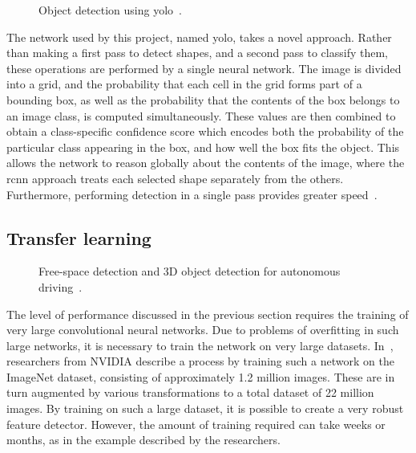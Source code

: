\documentclass[\rootfolder/main.tex]{subfiles}
\begin{document}
\begin{figure}[H]
    \caption[Object detection using \acrshort{yolo}.]{Object detection using \acrshort{yolo}~\cite{JosephRedmon}.}
    \label{fig:yolo}
\end{figure}

The network used by this project, named \acrfull{yolo}, takes a novel approach.
Rather than making a first pass to detect shapes, and a second pass to classify them, these operations are performed by a single neural network.
The image is divided into a grid, and the probability that each cell in the grid forms part of a bounding box, as well as the probability that the contents of the box belongs to an image class, is computed simultaneously.
These values are then combined to obtain a class-specific confidence score which encodes both the probability of the particular class appearing in the box, and how well the box fits the object.
This allows the network to reason globally about the contents of the image, where the \acrshort{rcnn} approach treats each selected shape separately from the others.
Furthermore, performing detection in a single pass provides greater speed~\cite{Redmon2015}.


\subsection{Transfer learning}

\begin{figure}
    \caption[Free-space detection and 3D object detection for autonomous driving.]{Free-space detection and 3D object detection for autonomous driving~\cite{NVIDIA}.}
    \label{fig:nvidia-cnn}
\end{figure}

The level of performance discussed in the previous section requires the training of very large convolutional neural networks.
Due to problems of overfitting in such large networks, it is necessary to train the network on very large datasets.
In~\cite{NVIDIA}, researchers from NVIDIA describe a process by training such a network on the ImageNet dataset, consisting of approximately 1.2 million images.
These are in turn augmented by various transformations to a total dataset of 22 million images.
By training on such a large dataset, it is possible to create a very robust feature detector.
However, the amount of training required can take weeks or months, as in the example described by the researchers.
\end{document}
